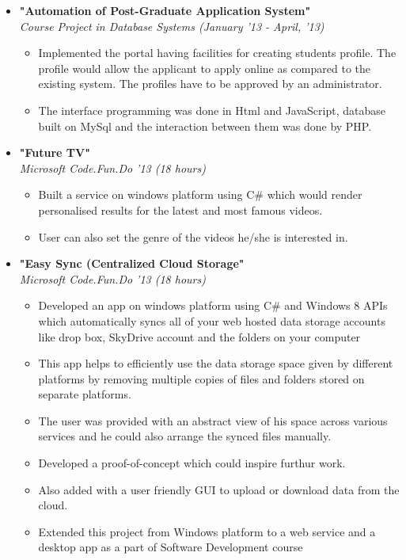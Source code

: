 \documentclass[margin,line]{resume}
\begin{document}
\begin{resume}
\begin{itemize}
  \item \large{\textbf{\textsf{"Automation of Post-Graduate Application System"}}}
    \\ \small{\textit{Course Project in Database Systems (January '13 - April, '13)}}
    \normalsize
    \begin{itemize}
    \item Implemented the portal having facilities for creating students profile. The profile would allow the applicant to apply online as compared to the existing system. The profiles have to be approved by an administrator.         
    \item The interface programming was done in Html and JavaScript, database built on MySql and the interaction between them was done by PHP.
    \end{itemize}

  \item \large{\textbf{\textsf{"Future TV"}}}
    \\ \small{\textit{Microsoft Code.Fun.Do '13 (18 hours)}}
    \normalsize
    \begin{itemize}
    \item Built a service on windows platform using C\# which would render personalised results for the latest and most famous videos.
    \item User can also set the genre of the videos he/she is interested in.
    \end{itemize}

  \item \large{\textbf{\textsf{"Easy Sync (Centralized Cloud Storage"}}}
    \\ \small{\textit{Microsoft Code.Fun.Do '13 (18 hours)}}
    \normalsize
    \begin{itemize}
    \item Developed an app on windows platform using C\# and Windows 8 APIs which automatically syncs all of your web hosted data storage accounts like drop box, SkyDrive account and the folders on your computer 
    \item This app helps to efficiently use the data storage space given by different platforms by removing multiple copies of files and folders stored on separate platforms.
    \item The user was provided with an abstract view of his space across various services and he could also arrange the synced files manually.
    \item Developed a proof-of-concept which could inspire furthur work.
    \item Also added with a user friendly GUI to upload or download data from the cloud.
    \item Extended this project from Windows platform to a web service and a desktop app as a part of Software Development course
    \end{itemize}


\end{itemize}
\end{resume}
\end{document}
